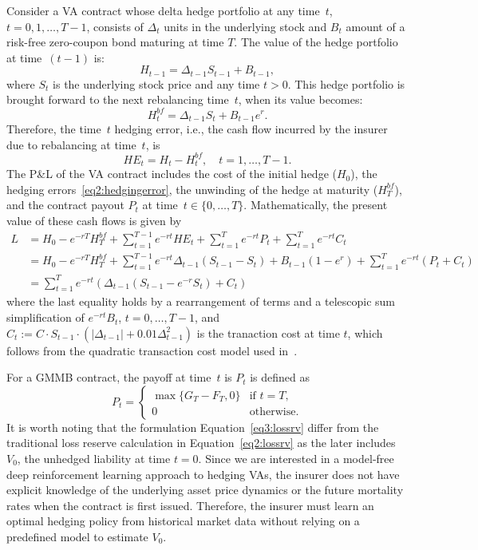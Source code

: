 Consider a VA contract whose delta hedge portfolio at any time~$t$, $t=0,1,\ldots,T-1$, consists of $\Delta_t$ units in the underlying stock and $B_t$ amount of a risk-free zero-coupon bond maturing at time $T$.
The value of the hedge portfolio at time~$(t-1)$ is:
\begin{equation*}
    H_{t-1} = \Delta_{t-1} S_{t-1} + B_{t-1},
\end{equation*}
where $S_t$ is the underlying stock price and any time $t>0$.
This hedge portfolio is brought forward to the next rebalancing time~$t$, when its value becomes:
\begin{equation*}
    H_{t}^{bf} = \Delta_{t-1} S_{t} + B_{t-1}e^{r}.
\end{equation*}
Therefore, the time~$t$ hedging error, i.e., the cash flow incurred by the insurer due to rebalancing at time~$t$, is
\begin{equation}
    HE_t = H_t - H^{bf}_t, \quad t=1,\ldots, T-1.
\end{equation}
The P\&L of the VA contract includes the cost of the initial hedge ($H_0$), the hedging errors~\eqref{eq2:hedgingerror}, the unwinding of the hedge at maturity ($H^{bf}_T$), and the contract payout $P_t$ at time~$t\in \{0,\ldots,T\}$.
Mathematically, the present value of these cash flows is given by
\begin{align}
L   & = H_0 - e^{-rT} H^{bf}_T + \sum_{t=1}^{T-1} e^{-rt} HE_t  + \sum_{t=1}^T e^{-rt} P_t + \sum_{t=1}^T e^{-rt} C_t  \\ 
    & = H_0 - e^{-rT} H^{bf}_T + \sum_{t=1}^{T-1} e^{-rt} \Delta_{t-1} (S_{t-1} - S_{t}) + B_{t-1}(1-e^{r}) + \sum_{t=1}^T e^{-rt} (P_t + C_t) \nonumber \\
    & = \sum_{t=1}^T e^{-rt} \left( \Delta_{t-1} (S_{t-1} - e^{-r} S_t) + C_t \right) \label{eq3:lossrv}
\end{align}
where the last equality holds by a rearrangement of terms and a telescopic sum simplification of $e^{-rt}B_t$, $t=0,\ldots,T-1$, and $C_t := C \cdot S_{t-1} \cdot (|\Delta_{t-1}| + 0.01 \Delta_{t-1}^2)$ is the tranaction cost at time $t$, which follows from the quadratic transaction cost model used in~\cite{garleanu2013dynamic}.

For a GMMB contract, the payoff at time~$t$ is $P_t$ is defined as
\begin{equation} \label{eq3:gmmb_payout}
    P_t = 
    \begin{cases}
        \max\{G_T - F_T, 0\} & \text{if } t = T, \\
        0 & \text{otherwise}.
    \end{cases}
\end{equation}
It is worth noting that the formulation Equation~\ref{eq3:lossrv} differ from the traditional loss reserve calculation in Equation~\ref{eq2:lossrv} as the later includes $V_0$, the unhedged liability at time $t=0$.
Since we are interested in a model-free deep reinforcement learning approach to hedging VAs, the insurer does not have explicit knowledge of the underlying asset price dynamics or the future mortality rates when the contract is first issued.
Therefore, the insurer must learn an optimal hedging policy from historical market data without relying on a predefined model to estimate $V_0$.

